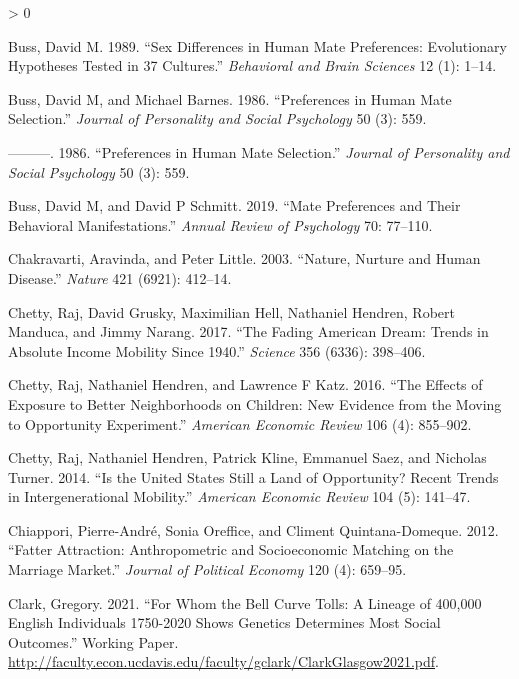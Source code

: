 \documentclass[
]{article}
\newlength{\cslhangindent}
\newenvironment{CSLReferences}[2] %
 {%
  \setlength{\parindent}{0pt}
  \ifodd #1 \everypar{\setlength{\hangindent}{\cslhangindent}}\ignorespaces\fi
  \ifnum #2 > 0
  \setlength{\parskip}{#2\baselineskip}
  \fi
 }%
 {}
\begin{document}
\begin{CSLReferences}{1}{0}
\leavevmode\hypertarget{ref-buss1989sex}{}%
Buss, David M. 1989. {``Sex Differences in Human Mate Preferences: Evolutionary Hypotheses Tested in 37 Cultures.''} \emph{Behavioral and Brain Sciences} 12 (1): 1--14.

\leavevmode\hypertarget{ref-buss1986preferences}{}%
Buss, David M, and Michael Barnes. 1986. {``Preferences in Human Mate Selection.''} \emph{Journal of Personality and Social Psychology} 50 (3): 559.

\leavevmode\hypertarget{ref-buss1986preferences}{}%
---------. 1986. {``Preferences in Human Mate Selection.''} \emph{Journal of Personality and Social Psychology} 50 (3): 559.

\leavevmode\hypertarget{ref-buss2019mate}{}%
Buss, David M, and David P Schmitt. 2019. {``Mate Preferences and Their Behavioral Manifestations.''} \emph{Annual Review of Psychology} 70: 77--110.

\leavevmode\hypertarget{ref-chakravarti2003nature}{}%
Chakravarti, Aravinda, and Peter Little. 2003. {``Nature, Nurture and Human Disease.''} \emph{Nature} 421 (6921): 412--14.

\leavevmode\hypertarget{ref-chetty2017fading}{}%
Chetty, Raj, David Grusky, Maximilian Hell, Nathaniel Hendren, Robert Manduca, and Jimmy Narang. 2017. {``The Fading American Dream: Trends in Absolute Income Mobility Since 1940.''} \emph{Science} 356 (6336): 398--406.

\leavevmode\hypertarget{ref-chetty2016effects}{}%
Chetty, Raj, Nathaniel Hendren, and Lawrence F Katz. 2016. {``The Effects of Exposure to Better Neighborhoods on Children: New Evidence from the Moving to Opportunity Experiment.''} \emph{American Economic Review} 106 (4): 855--902.

\leavevmode\hypertarget{ref-chetty2014united}{}%
Chetty, Raj, Nathaniel Hendren, Patrick Kline, Emmanuel Saez, and Nicholas Turner. 2014. {``Is the United States Still a Land of Opportunity? Recent Trends in Intergenerational Mobility.''} \emph{American Economic Review} 104 (5): 141--47.

\leavevmode\hypertarget{ref-chiappori2012fatter}{}%
Chiappori, Pierre-André, Sonia Oreffice, and Climent Quintana-Domeque. 2012. {``Fatter Attraction: Anthropometric and Socioeconomic Matching on the Marriage Market.''} \emph{Journal of Political Economy} 120 (4): 659--95.

\leavevmode\hypertarget{ref-clark2021bell}{}%
Clark, Gregory. 2021. {``For Whom the Bell Curve Tolls: A Lineage of 400,000 English Individuals 1750-2020 Shows Genetics Determines Most Social Outcomes.''} Working Paper. \url{http://faculty.econ.ucdavis.edu/faculty/gclark/ClarkGlasgow2021.pdf}.


\end{CSLReferences}
\end{document}
